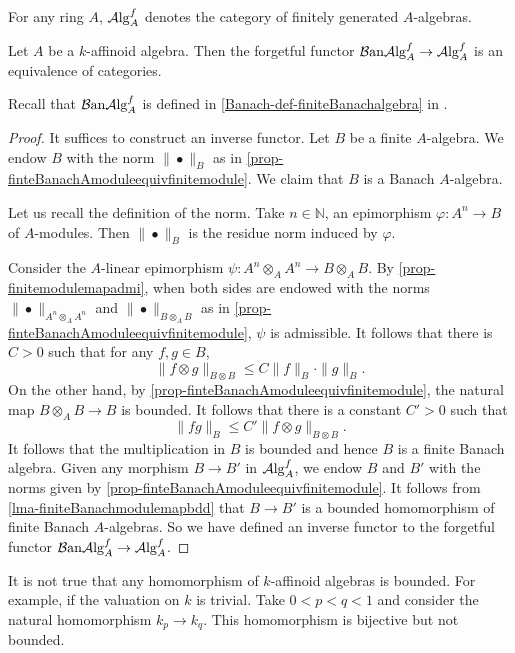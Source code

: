 For any ring $A$, $\mathcal{A}\mathrm{lg}_A^f$ denotes the category of finitely generated $A$-algebras.

\begin{proposition}\label{prop-Banachalgebrafiniteforget}
    Let $A$ be a $k$-affinoid algebra. Then the forgetful functor $\mathcal{B}\mathrm{an}\mathcal{A}\mathrm{lg}_A^f\rightarrow \mathcal{A}\mathrm{lg}_A^f$ is an equivalence of categories.
\end{proposition}
Recall that $\mathcal{B}\mathrm{an}\mathcal{A}\mathrm{lg}_A^f$ is defined in \cref{Banach-def-finiteBanachalgebra} in .
\begin{proof}
    It suffices to construct an inverse functor. Let $B$ be a finite $A$-algebra. 
    We endow $B$ with the norm $\|\bullet\|_B$ as in \cref{prop-finteBanachAmoduleequivfinitemodule}. We claim that $B$ is a Banach $A$-algebra.

    Let us recall the definition of the norm.
    Take $n\in \mathbb{N}$, an epimorphism $\varphi:A^n\rightarrow B$ of $A$-modules. Then $\|\bullet\|_B$ is the residue norm induced by $\varphi$.

    Consider the $A$-linear epimorphism $\psi:A^n\otimes_A A^n\rightarrow B\otimes_A B$. By \cref{prop-finitemodulemapadmi}, when both sides are endowed with the norms $\|\bullet\|_{A^n\otimes_A A^n}$ and $\|\bullet\|_{B\otimes_A B}$ as in \cref{prop-finteBanachAmoduleequivfinitemodule}, $\psi$ is admissible. It follows that there is $C>0$ such that for any $f,g\in B$,
    \[
        \|f\otimes g\|_{B\otimes B}\leq C\|f\|_B \cdot\|g\|_B.  
    \]
    On the other hand, by \cref{prop-finteBanachAmoduleequivfinitemodule}, the natural map $B\otimes_A B\rightarrow B$ is bounded. It follows that there is a constant $C'>0$ such that
    \[
        \|fg\|_B\leq C'\|f\otimes g\|_{B\otimes B}.
    \]
    It follows that the multiplication in $B$ is bounded and hence $B$ is a finite Banach algebra. Given any morphism $B\rightarrow B'$ in $\mathcal{A}\mathrm{lg}_A^f$, we endow $B$ and $B'$ with the norms given by \cref{prop-finteBanachAmoduleequivfinitemodule}. It follows from \cref{lma-finiteBanachmodulemapbdd} that $B\rightarrow B'$ is a bounded homomorphism of finite Banach $A$-algebras. So we have defined an inverse functor to the forgetful functor $\mathcal{B}\mathrm{an}\mathcal{A}\mathrm{lg}_A^f\rightarrow \mathcal{A}\mathrm{lg}_A^f$.
\end{proof}
\begin{remark}
    It is not true that any homomorphism of $k$-affinoid algebras is bounded. For example, if the valuation on $k$ is trivial. Take $0<p<q<1$ and consider the natural homomorphism $k_p\rightarrow k_q$. This homomorphism is bijective but not bounded.
\end{remark}


